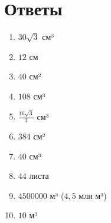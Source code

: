 \documentclass{umk-matematika}
\begin{document}
\newpage
\section*{Ответы}

\begin{enumerate}
  \item $30\sqrt{3}$ см³
  \item $12$ см
  \item $40$ см²
  \item $108$ см³
  \item $\frac{16\sqrt{3}}{3}$ см³
  \item $384$ см²
  \item $40$ см³
  \item $44$ листа
  \item $4500000$ м³ ($4{,}5$ млн м³)
  \item $10$ м³
\end{enumerate}
\end{document}
